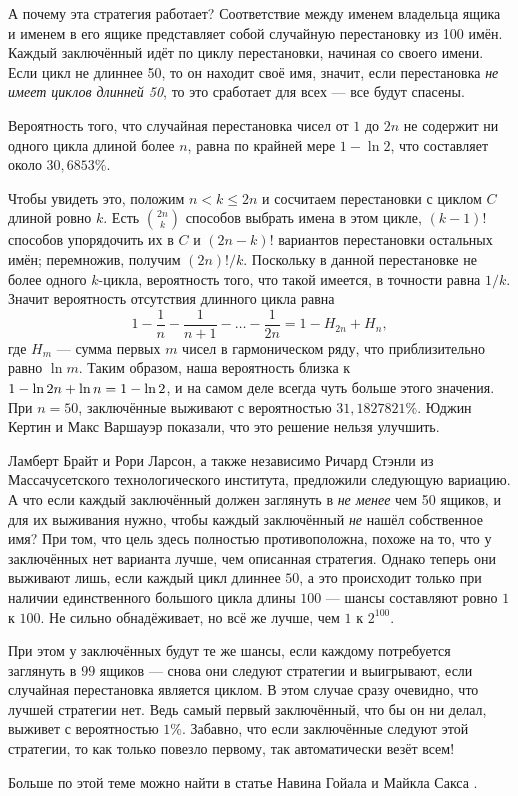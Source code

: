 А почему эта стратегия работает?
Соответствие между именем владельца ящика и именем в его ящике представляет собой случайную перестановку из 100 имён.
Каждый заключённый идёт по циклу перестановки, начиная со своего имени.
Если цикл не длиннее 50, то он находит своё имя,
значит, если перестановка \emph{не имеет циклов длинней 50}, то это сработает для всех --- все будут спасены.

Вероятность того, что случайная перестановка чисел от $1$ до $2n$ не содержит ни одного цикла длиной более $n$, равна по крайней мере $1-\ln 2$, что составляет около $30{,}6853\%$.

Чтобы увидеть это, положим $n < k \le 2n$ и сосчитаем перестановки с циклом $C$ длиной ровно $k$.
Есть $\binom{2n}k$ способов выбрать имена в этом цикле, $(k - 1)!$ способов упорядочить их в $C$
и $(2n - k)!$ вариантов перестановки остальных имён;
перемножив, получим $(2n)!/k$.
Поскольку в данной перестановке не более одного $k$-цикла, вероятность того, что такой имеется, в точности равна $1/k$.
Значит вероятность отсутствия длинного цикла равна
\[1-\frac{1}{n}-\frac{1}{n+1}-\dots-\frac{1}{2n}=1-H_{2n}+H_n,\]
где $H_m$ --- сумма первых $m$ чисел в гармоническом ряду, что приблизительно равно $\ln m$.
Таким образом, наша вероятность близка к $1 - \ln 2n \z+ \ln n = 1 - \ln 2$, и на самом деле всегда чуть больше этого значения.
При $n = 50$, заключённые выживают с вероятностью $31,1827821\%$.
Юджин Кертин и Макс Варшауэр \cite{13} показали, что это решение нельзя улучшить.

Ламберт Брайт и Рори Ларсон, а также независимо Ричард Стэнли из Массачусетского технологического института, предложили следующую вариацию.
А что если каждый заключённый должен заглянуть в \emph{не менее} чем 50 ящиков, и для их выживания нужно, чтобы каждый заключённый \emph{не} нашёл собственное имя?
При том, что цель здесь полностью противоположна, похоже на то, что у заключённых нет варианта лучше, чем описанная стратегия.
Однако теперь они выживают лишь, если каждый цикл длиннее $50$, а это происходит только при наличии единственного большого цикла длины $100$ --- шансы составляют ровно $1$ к $100$.
Не сильно обнадёживает, но всё же лучше, чем $1$ к $2^{100}$.

При этом у заключённых будут те же шансы, если каждому потребуется заглянуть в $99$ ящиков --- снова они следуют стратегии и выигрывают, если случайная перестановка является циклом.
В этом случае сразу очевидно, что лучшей стратегии нет.
Ведь самый первый заключённый, что бы он ни делал, выживет с вероятностью $1\%$.
Забавно, что если заключённые следуют этой стратегии, то как только повезло первому, так автоматически везёт всем!

\begin{addedbytheeditors}
Больше по этой теме можно найти в статье Навина Гойала и Майкла Сакса \cite{goyal-saks}.
\pr
\end{addedbytheeditors}
